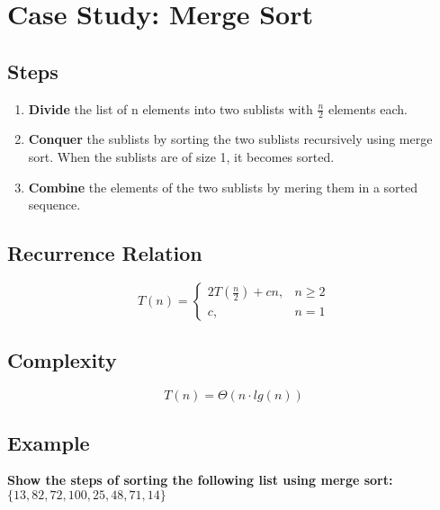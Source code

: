 \section{Case Study: Merge Sort}

\subsection*{Steps}

\begin{enumerate}
	\item \textbf{Divide} the list of n elements into two sublists with $\frac{n}{2}$ elements each.
	\item \textbf{Conquer} the sublists by sorting the two sublists recursively using merge sort. When the sublists are of size 1, it becomes sorted.
	\item \textbf{Combine} the elements of the two sublists by mering them in a sorted sequence.
\end{enumerate}

\subsection*{Recurrence Relation}
$$
T(n) = \begin{cases}
2T\left(\frac{n}{2}\right) + cn, & n \geq 2\\
c, & n = 1
\end{cases}
$$

\subsection*{Complexity}
$$
T(n) = \Theta(n \cdot lg(n))
$$

\subsection{Example}
\textbf{Show the steps of sorting the following list using merge sort: $\{ 13, 82, 72, 100, 25, 48, 71, 14 \}$}